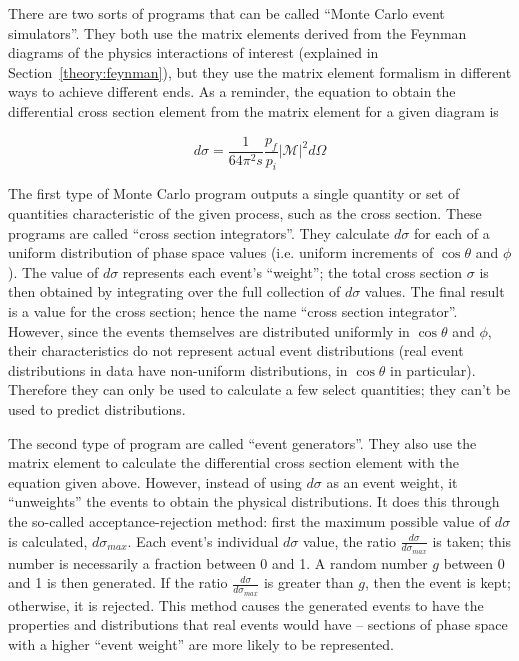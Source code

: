 


There are two sorts of programs that can be called 
``Monte Carlo event simulators''.  
They both use the matrix elements derived from 
the Feynman diagrams of the physics interactions of interest 
(explained in Section~\ref{theory:feynman}), %
but they use the matrix element formalism 
in different ways to achieve different ends.  
As a reminder, the equation to obtain the 
differential cross section element %
from the matrix element for a given diagram is 

\[
d \sigma
= \frac{1}{64 \pi^2 s} \frac{p_f}{p_i} \left| \mathcal{M} \right| ^2 d \Omega
\]

The first type of Monte Carlo program outputs 
a single quantity or set of quantities characteristic 
of the given process, 
such as the cross section.  
These programs are called ``cross section integrators''.  
They calculate 
$d\sigma$ for each of a uniform distribution of 
phase space values (i.e. uniform increments 
of $\cos\theta$ and $\phi$).  
The value of $d\sigma$ represents each event's ``weight''; 
the total cross section $\sigma$ is then obtained 
by integrating over the full collection of $d\sigma$ values.  
The final result is a value for the cross section; 
hence the name ``cross section integrator''.  
However, since the events themselves are distributed 
uniformly in $\cos\theta$ and $\phi$, 
their characteristics 
do not represent actual event distributions 
(real event distributions in data have 
non-uniform distributions, 
in $\cos\theta$ in particular).  
Therefore they can only be used to calculate 
a few select quantities; 
they can't be used to predict distributions.  

The second type of program are called ``event generators''.  
They also use the matrix element to calculate 
the differential cross section element %
with the equation given above.  
However, instead of using $d\sigma$ as an event weight, 
it ``unweights'' the events to obtain the physical 
distributions.  
It does this through the so-called acceptance-rejection method: 
first the maximum possible value of $d\sigma$ is calculated, 
$d\sigma_{max}$. 
Each event's individual $d\sigma$ value, 
the ratio $\frac{d\sigma}{d\sigma_{max}}$ is taken; 
this number is necessarily a fraction between 0 and 1.  
A random number $g$ between 0 and 1 is then generated.  
If the ratio $\frac{d\sigma}{d\sigma_{max}}$ is greater 
than $g$, then the event is kept; %
otherwise, it is rejected.  
This method causes the generated events to have the properties 
and distributions that real events would have -- %
sections of phase space with a higher ``event weight'' 
are more likely to be represented.  


